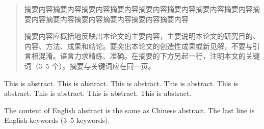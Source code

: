 
\begin{abstract}
  摘要内容摘要内容摘要内容摘要内容摘要内容摘要内容摘要内容摘要内容摘要内容摘要内容摘要内容摘要内容摘要内容摘要内容

  摘要内容应概括地反映出本论文的主要内容，主要说明本论文的研究目的、内容、方法、成果和结论。要突出本论文的创造性成果或新见解，不要与引言相混淆。语言力求精练、准确。在摘要的下方另起一行，注明本文的关键词（3--5 个）。摘要与关键词应在同一页。
\end{abstract}

\begin{abstract*}
  This is abstract. This is abstract. This is abstract. This is abstract. This is abstract. This is abstract. This is abstract. This is abstract.

  The content of English abstract is the same as Chinese abstract. The last line is English keywords (3--5 keywords).
\end{abstract*}


